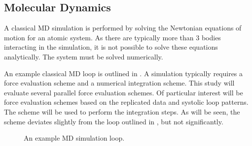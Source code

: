 %
%
\subsection{Molecular Dynamics}

%
A classical MD simulation is performed by
solving the Newtonian equations of motion for
an atomic system.
%
As there are typically more than 3 bodies interacting in the simulation,
it is not possible to solve these equations analytically.
%
The system must be solved numerically.

%
An example classical MD loop is outlined in .
%
A simulation typically requires a force evaluation scheme
and a numerical integration scheme.
%
This study will evaluate several parallel force evaluation schemes.
%
Of particular interest will be force evaluation schemes based on
the replicated data and systolic loop patterns.
%
The \velocityverlet{} scheme will be used to perform the integration steps.
%
As will be seen, the \velocityverlet{} scheme deviates slightly from
the loop outlined in , but not significantly.

\begin{figure}[!h]
    \begin{center}
    \end{center}
    \caption{An example MD simulation loop.}
    \label{fig:md_loop_flow_chart}
\end{figure}


